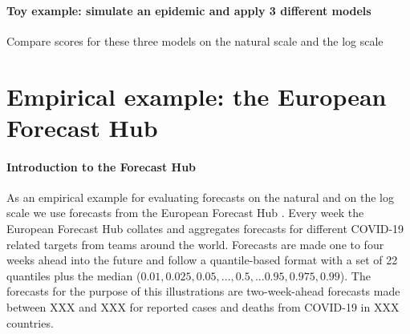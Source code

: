 \documentclass{article}
\begin{document}







\paragraph{Toy example: simulate an epidemic and apply 3 different models} Compare scores for these three models on the natural scale and the log scale


\section{Empirical example: the European Forecast Hub}

\paragraph{Introduction to the Forecast Hub} As an empirical example for evaluating forecasts on the natural and on the log scale we use forecasts from the European Forecast Hub \citep{europeancovid-19forecasthubEuropeanCovid19Forecast2021}. Every week the European Forecast Hub collates and aggregates forecasts for different COVID-19 related targets from teams around the world. Forecasts are made one to four weeks ahead into the future and follow a quantile-based format with a set of 22 quantiles plus the median ($0.01, 0.025, 0.05, ..., 0.5, ... 0.95, 0.975, 0.99$). The forecasts for the purpose of this illustrations are two-week-ahead forecasts made between XXX and XXX for reported cases and deaths from COVID-19 in XXX countries. 
\end{document}
